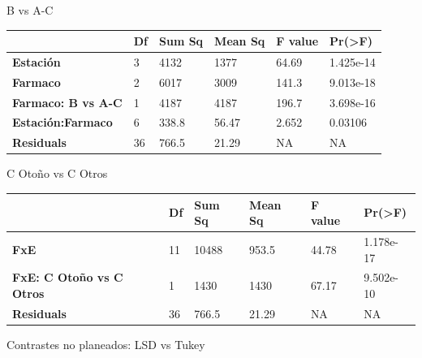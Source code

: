 \documentclass[]{book}
\theoremstyle{definition}
\theoremstyle{definition}
\theoremstyle{definition}
\theoremstyle{remark}
\begin{document}
B vs A-C

\begin{longtable}[]{@{}llllll@{}}
\toprule
& Df & Sum Sq & Mean Sq & F value & Pr(\textgreater{}F)\tabularnewline
\midrule
\endhead
\textbf{Estación} & 3 & 4132 & 1377 & 64.69 & 1.425e-14\tabularnewline
\textbf{Farmaco} & 2 & 6017 & 3009 & 141.3 & 9.013e-18\tabularnewline
\textbf{Farmaco: B vs A-C} & 1 & 4187 & 4187 & 196.7 &
3.698e-16\tabularnewline
\textbf{Estación:Farmaco} & 6 & 338.8 & 56.47 & 2.652 &
0.03106\tabularnewline
\textbf{Residuals} & 36 & 766.5 & 21.29 & NA & NA\tabularnewline
\bottomrule
\end{longtable}

C Otoño vs C Otros

\begin{longtable}[]{@{}llllll@{}}
\toprule
& Df & Sum Sq & Mean Sq & F value & Pr(\textgreater{}F)\tabularnewline
\midrule
\endhead
\textbf{FxE} & 11 & 10488 & 953.5 & 44.78 & 1.178e-17\tabularnewline
\textbf{FxE: C Otoño vs C Otros} & 1 & 1430 & 1430 & 67.17 &
9.502e-10\tabularnewline
\textbf{Residuals} & 36 & 766.5 & 21.29 & NA & NA\tabularnewline
\bottomrule
\end{longtable}

Contrastes no planeados: LSD vs Tukey
\end{document}

